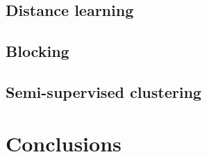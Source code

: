 \documentclass{article}
\begin{document}
\subsection{Distance learning}

\subsection{Blocking}

\subsection{Semi-supervised clustering}



\section{Conclusions}
\label{conclusions}



\nocite{langley00} %



\end{document}
